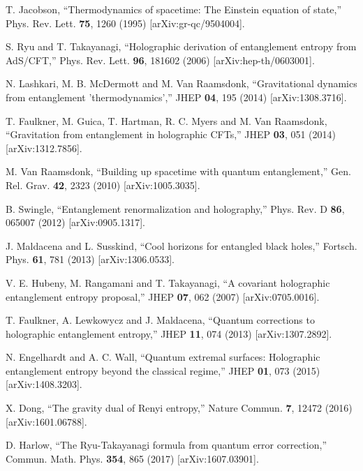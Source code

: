 \documentclass[11pt,letterpaper]{article}
\begin{document}
\begin{thebibliography}{99}

T. Jacobson, ``Thermodynamics of spacetime: The Einstein equation of state,''
Phys. Rev. Lett. \textbf{75}, 1260 (1995) [arXiv:gr-qc/9504004].

S. Ryu and T. Takayanagi, ``Holographic derivation of entanglement entropy from AdS/CFT,''
Phys. Rev. Lett. \textbf{96}, 181602 (2006) [arXiv:hep-th/0603001].

N. Lashkari, M. B. McDermott and M. Van Raamsdonk, ``Gravitational dynamics from entanglement 'thermodynamics',''
JHEP \textbf{04}, 195 (2014) [arXiv:1308.3716].

T. Faulkner, M. Guica, T. Hartman, R. C. Myers and M. Van Raamsdonk, ``Gravitation from entanglement in holographic CFTs,''
JHEP \textbf{03}, 051 (2014) [arXiv:1312.7856].

M. Van Raamsdonk, ``Building up spacetime with quantum entanglement,''
Gen. Rel. Grav. \textbf{42}, 2323 (2010) [arXiv:1005.3035].

B. Swingle, ``Entanglement renormalization and holography,''
Phys. Rev. D \textbf{86}, 065007 (2012) [arXiv:0905.1317].

J. Maldacena and L. Susskind, ``Cool horizons for entangled black holes,''
Fortsch. Phys. \textbf{61}, 781 (2013) [arXiv:1306.0533].

V. E. Hubeny, M. Rangamani and T. Takayanagi, ``A covariant holographic entanglement entropy proposal,''
JHEP \textbf{07}, 062 (2007) [arXiv:0705.0016].

T. Faulkner, A. Lewkowycz and J. Maldacena, ``Quantum corrections to holographic entanglement entropy,''
JHEP \textbf{11}, 074 (2013) [arXiv:1307.2892].

N. Engelhardt and A. C. Wall, ``Quantum extremal surfaces: Holographic entanglement entropy beyond the classical regime,''
JHEP \textbf{01}, 073 (2015) [arXiv:1408.3203].

X. Dong, ``The gravity dual of Renyi entropy,''
Nature Commun. \textbf{7}, 12472 (2016) [arXiv:1601.06788].

D. Harlow, ``The Ryu-Takayanagi formula from quantum error correction,''
Commun. Math. Phys. \textbf{354}, 865 (2017) [arXiv:1607.03901].


\end{thebibliography}
\end{document}
